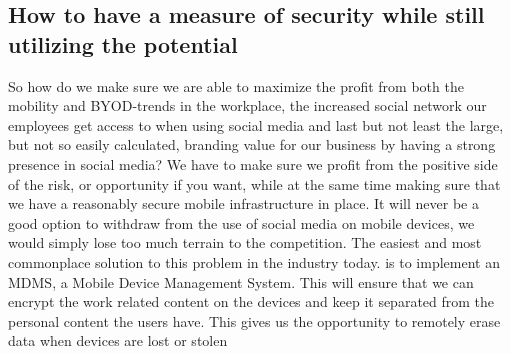 \subsection*{How to have a measure of security while still utilizing the potential}
So how do we make sure we are able to maximize the profit from both the mobility and BYOD-trends in the workplace, the increased social network our employees get access to when using social media and last but not least the large, but not so easily calculated, branding value for our business by having a strong presence in social media?
We have to make sure we profit from the positive side of the risk, or opportunity if you want, while at the same time making sure that we have a reasonably secure mobile infrastructure in place. It will never be a good option to withdraw from the use of social media on mobile devices, we would simply lose too much terrain to the competition.
The easiest and most commonplace solution to this problem in the industry today. is to implement an MDMS, a Mobile Device Management System. This will ensure that we can encrypt the work related content on the devices and keep it separated from the personal content the users have. This gives us the opportunity to remotely erase data when devices are lost or stolen

